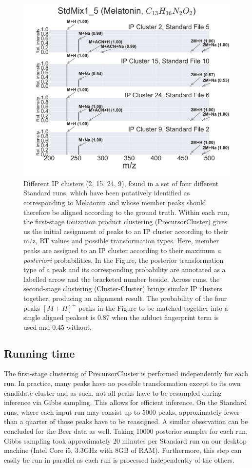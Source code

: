 \begin{figure}
\centering
\includegraphics[width=0.75\linewidth]{05-precursor-cluster/figures/melatonin.pdf}
\caption{\label{fig:06} Different IP clusters (2, 15, 24, 9), found in a set of four different Standard runs, which have been putatively identified as corresponding to Melatonin and whose member peaks should therefore be aligned according to the ground truth. Within each run, the first-stage ionization product clustering (PrecursorCluster) gives us the initial assignment of peaks to an IP cluster according to their m/z, RT values and possible transformation types. Here, member peaks are assigned to an IP cluster according to their maximum \textit{a posteriori} probabilities. In the Figure, the posterior transformation type of a peak and its corresponding probability are annotated as a labelled arrow and the bracketed number beside. Across runs, the second-stage clustering (Cluster-Cluster) brings similar IP clusters together, producing an alignment result. The probability of the four peaks $[M+H]^+$ peaks in the Figure to be matched together into a single aligned peakset is 0.87 when the adduct fingerprint term is used and 0.45 without. }
\end{figure}


\subsection{Running time}

The first-stage clustering of PrecursorCluster is performed independently for each run. In practice, many peaks have no possible transformation except to its own candidate cluster and as such, not all peaks have to be resampled during inference via Gibbs sampling. This allows for efficient inference. On the Standard runs, where each input run may consist up to 5000 peaks, approximately fewer than a quarter of those peaks have to be reassigned. A similar observation can be concluded for the Beer data as well. Taking 10000 posterior samples for each run, Gibbs sampling took approximately 20 minutes per Standard run on our desktop machine (Intel Core i5, 3.3GHz with 8GB of RAM). Furthermore, this step can easily be run in parallel as each run is processed independently of the others.

